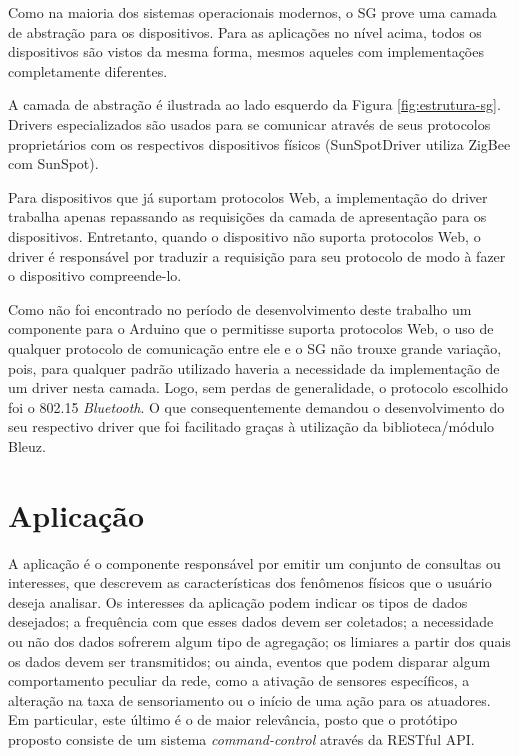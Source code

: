 \documentclass[12pt,a4paper,oneside]{report}
\begin{document}
Como na maioria dos sistemas operacionais modernos, o SG prove uma camada de abstração para os dispositivos. Para as aplicações no nível acima, todos os dispositivos são vistos da mesma forma, mesmos aqueles com implementações completamente diferentes.

A camada de abstração é ilustrada ao lado esquerdo da Figura \ref{fig:estrutura-sg}. Drivers especializados são usados para se comunicar através de seus protocolos proprietários com os respectivos dispositivos físicos (SunSpotDriver utiliza ZigBee com SunSpot).

Para dispositivos que já suportam protocolos Web, a implementação do driver trabalha apenas repassando as requisições da camada de apresentação para os dispositivos. Entretanto, quando o dispositivo não suporta protocolos Web, o driver é responsável por traduzir a requisição para seu protocolo de modo à fazer o dispositivo compreende-lo.

Como não foi encontrado no período de desenvolvimento deste trabalho um componente para o Arduino que o permitisse suporta protocolos Web, o uso de qualquer protocolo de comunicação entre ele e o SG não trouxe grande variação, pois, para qualquer padrão utilizado haveria a necessidade da implementação de um driver nesta camada. Logo, sem perdas de generalidade, o protocolo escolhido foi o 802.15 \emph{Bluetooth}. O que consequentemente demandou o desenvolvimento do seu respectivo driver que foi facilitado graças à utilização da biblioteca/módulo Bleuz.

\section{Aplicação}

A aplicação é o componente responsável por emitir um conjunto de consultas ou interesses, que descrevem as características dos fenômenos físicos que o usuário deseja analisar. Os interesses da aplicação podem indicar os tipos de dados desejados; a frequência com que esses dados devem ser coletados; a necessidade ou não dos dados sofrerem algum tipo de agregação; os limiares a partir dos quais os dados devem ser transmitidos; ou ainda, eventos que podem disparar algum comportamento peculiar da rede, como a ativação de sensores específicos, a alteração na taxa de sensoriamento ou o início de uma ação para os atuadores. Em particular, este último é o de maior relevância, posto que o protótipo proposto consiste de um sistema  \emph{command-control} através da RESTful API.
\end{document}

